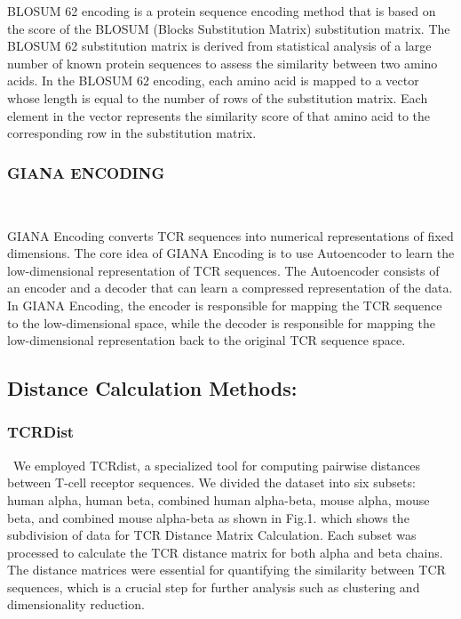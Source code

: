 \documentclass[conference]{IEEEtran}
\begin{document}
	BLOSUM 62\cite{b2} encoding is a protein sequence encoding method that is based on the score of the BLOSUM (Blocks Substitution Matrix) substitution matrix. The BLOSUM 62 substitution matrix is derived from statistical analysis of a large number of known protein sequences to assess the similarity between two amino acids. In the BLOSUM 62 encoding, each amino acid is mapped to a vector whose length is equal to the number of rows of the substitution matrix. Each element in the vector represents the similarity score of that amino acid to the corresponding row in the substitution matrix.
    \\
	
	\subsubsection{GIANA ENCODING} \
	
	GIANA Encoding\cite{b2} converts TCR sequences into numerical representations of fixed dimensions. The core idea of GIANA Encoding is to use Autoencoder to learn the low-dimensional representation of TCR sequences. The Autoencoder consists of an encoder and a decoder that can learn a compressed representation of the data. In GIANA Encoding, the encoder is responsible for mapping the TCR sequence to the low-dimensional space, while the decoder is responsible for mapping the low-dimensional representation back to the original TCR sequence space.
    \\
	
	\subsection{Distance Calculation Methods:}
	
	\subsubsection{TCRDist} \
	 We employed TCRdist, a specialized tool for computing pairwise distances between T-cell receptor sequences. We divided the dataset into six subsets: human alpha, human beta, combined human alpha-beta, mouse alpha, mouse beta, and combined mouse alpha-beta as shown in Fig.1. which shows the subdivision of data for TCR Distance Matrix Calculation. Each subset was processed to calculate the TCR distance matrix for both alpha and beta chains. The distance matrices were essential for quantifying the similarity between TCR sequences, which is a crucial step for further analysis such as clustering and dimensionality reduction. 
\end{document}
